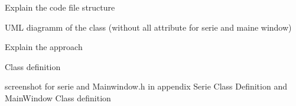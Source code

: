 Explain the code file structure 

UML diagramm of the class (without all attribute for serie and maine window)

Explain the approach

Class definition

 screenshot for serie and Mainwindow.h in appendix Serie Class Definition and MainWindow Class definition